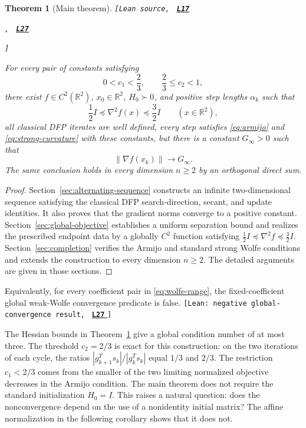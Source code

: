 \documentclass[11pt]{article}
\newtheorem{theorem}{Theorem}
\newcommand{\R}{\mathbb R}
\newcommand{\leanLinkText}[1]{%
  \underline{\textbf{#1}}%
}
\newcommand{\leanSnapshot}{e308927f5b7930bdd002f0c0e42b9d112ad821cb}
\newcommand{\leanDeclTag}[2]{%
  {\footnotesize\texttt{[Lean source, }}%
  \href{https://github.com/imathwy/DFP_wolfe_local/blob/\leanSnapshot/#1?plain=1\#L#2}%
    {\leanLinkText{\footnotesize\texttt{L#2}}}%
}
\newcommand{\leanDeclTagExtra}[2]{%
  \unskip
  {\footnotesize\texttt{, }}%
  \href{https://github.com/imathwy/DFP_wolfe_local/blob/\leanSnapshot/#1?plain=1\#L#2}%
    {\leanLinkText{\footnotesize\texttt{L#2}}}\allowbreak
}
\newcommand{\leanDeclTagEnd}{%
  \unskip
  {\footnotesize\texttt{]}}\enspace
}
\newcommand{\leanClaimTag}[3]{%
  {\footnotesize\texttt{[Lean: #1, }}%
  \href{https://github.com/imathwy/DFP_wolfe_local/blob/\leanSnapshot/#2?plain=1\#L#3}%
    {\leanLinkText{\footnotesize\texttt{L#3}}}%
  {\footnotesize\texttt{]}}\enspace
}
\begin{document}
\begin{theorem}[Main theorem]\label{thm:main}
\leanDeclTag{DFPWolfe/A_uniformly_convex_counterexample_to_global_convergence_of_DFP_under_weak_Wolfe_/Theorem_Main_theorem.lean}{17}
\leanDeclTagExtra{DFPWolfe/A_uniformly_convex_counterexample_to_global_convergence_of_DFP_under_weak_Wolfe_/Theorem_Main_theorem.lean}{27}
\leanDeclTagEnd
For every pair of constants satisfying
\begin{equation}\label{eq:wolfe-range}
0<c_1<\frac23,\qquad \frac23\le c_2<1,
\end{equation}
there exist $f\in C^2(\R^2)$, $x_0\in\R^2$, $H_0\succ0$, and positive step
lengths $\alpha_k$ such that
\[
\frac12I\preceq\nabla^2f(x)\preceq\frac32I
\qquad(x\in\R^2),
\]
all classical DFP iterates are well defined, every step satisfies
\eqref{eq:armijo} and \eqref{eq:strong-curvature} with these constants, but
there is a constant $G_\infty>0$ such that
\[
\|\nabla f(x_k)\|\longrightarrow G_\infty.
\]
The same conclusion holds in every dimension $n\ge2$ by an orthogonal direct
sum.
\end{theorem}

\begin{proof}
Section~\ref{sec:alternating-sequence} constructs an infinite
two-dimensional sequence satisfying the classical DFP search-direction, secant, and update identities.  It also proves that the gradient norms converge to a positive constant.  Section~\ref{sec:global-objective} establishes a uniform separation bound and realizes the prescribed endpoint
data by a globally $C^2$ function satisfying
$\frac12 I\preceq\nabla^2 f\preceq\frac32 I$.
Section~\ref{sec:completion} verifies the Armijo and standard strong Wolfe conditions and extends the construction to every dimension $n\ge2$.
The detailed arguments are given in those sections.
\end{proof}

Equivalently, for every coefficient pair in \eqref{eq:wolfe-range}, the
fixed-coefficient global weak-Wolfe convergence predicate is false.
\leanClaimTag{negative global-convergence result}{DFPWolfe/A_uniformly_convex_counterexample_to_global_convergence_of_DFP_under_weak_Wolfe_/Theorem_Main_theorem.lean}{27}

The Hessian bounds in Theorem~\ref{thm:main} give a global condition number of
at most three.  The threshold $c_2=2/3$ is exact for this construction: on the
two iterations of each cycle, the ratios
$|g_{k+1}^Ts_k|/|g_k^Ts_k|$ equal $1/3$ and $2/3$.  The restriction $c_1<2/3$
comes from the smaller of the two limiting normalized objective decreases in
the Armijo condition.  The main theorem does not require the standard
initialization $H_0=I$.  This raises a natural question: does the
nonconvergence depend on the use of a nonidentity initial matrix?
The affine normalization in the following corollary shows that it does not.
\end{document}
